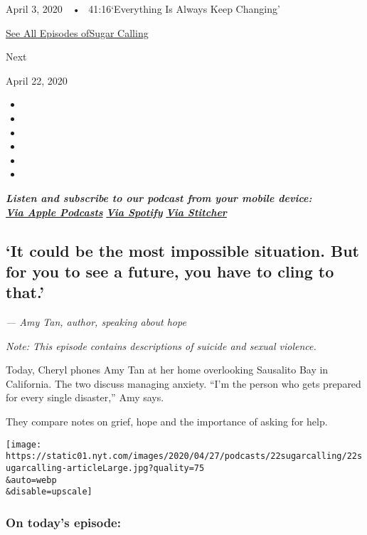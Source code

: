 April 3, 2020~~•~ 41:16`Everything Is Always Keep Changing'

\href{https://www.nytimes.com/column/sugar-calling}{See All Episodes
ofSugar Calling}

Next

April 22, 2020

\begin{itemize}
\item
\item
\item
\item
\item
\item
\end{itemize}

\emph{\textbf{Listen and subscribe to our podcast from your mobile
device:}}\\
\textbf{\href{https://podcasts.apple.com/us/podcast/sugar-calling/id1505881384}{\emph{Via
Apple Podcasts}}} \emph{\textbf{\textbar{}}}
\textbf{\href{https://open.spotify.com/show/4U8hPiNGIBvTS9zLeiDCN7?si=gRyigD47SPWl-QWgNjgt2w}{\emph{Via
Spotify}}} \emph{\textbf{\textbar{}}}
\textbf{\href{https://www.stitcher.com/podcast/the-new-york-times/sugar-calling}{\emph{Via
Stitcher}}}

\hypertarget{it-could-be-the-most-impossible-situation-but-for-you-to-see-a-future-you-have-to-cling-to-that}{%
\subsection{`It could be the most impossible situation. But for you to
see a future, you have to cling to
that.'}\label{it-could-be-the-most-impossible-situation-but-for-you-to-see-a-future-you-have-to-cling-to-that}}

\emph{--- Amy Tan, author, speaking about hope}

\emph{Note: This episode contains descriptions of suicide and sexual
violence.}

Today, Cheryl phones Amy Tan at her home overlooking Sausalito Bay in
California. The two discuss managing anxiety. ``I'm the person who gets
prepared for every single disaster,'' Amy says.

They compare notes on grief, hope and the importance of asking for help.

\texttt{[image: https://static01.nyt.com/images/2020/04/27/podcasts/22sugarcalling/22sugarcalling-articleLarge.jpg?quality=75\\\&auto=webp\\\&disable=upscale]}

\hypertarget{on-todays-episode}{%
\subsubsection{\texorpdfstring{\textbf{On today's
episode:}}{On today's episode:}}\label{on-todays-episode}}

